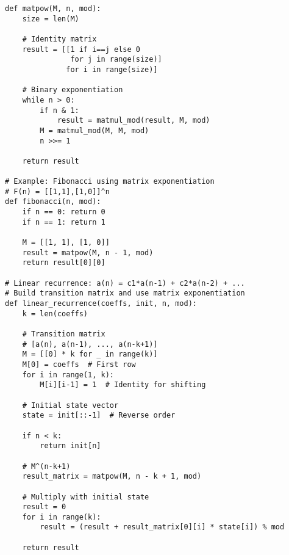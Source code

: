 \begin{lstlisting}
def matpow(M, n, mod):
    size = len(M)
    
    # Identity matrix
    result = [[1 if i==j else 0 
               for j in range(size)] 
              for i in range(size)]
    
    # Binary exponentiation
    while n > 0:
        if n & 1:
            result = matmul_mod(result, M, mod)
        M = matmul_mod(M, M, mod)
        n >>= 1
    
    return result

# Example: Fibonacci using matrix exponentiation
# F(n) = [[1,1],[1,0]]^n
def fibonacci(n, mod):
    if n == 0: return 0
    if n == 1: return 1
    
    M = [[1, 1], [1, 0]]
    result = matpow(M, n - 1, mod)
    return result[0][0]

# Linear recurrence: a(n) = c1*a(n-1) + c2*a(n-2) + ...
# Build transition matrix and use matrix exponentiation
def linear_recurrence(coeffs, init, n, mod):
    k = len(coeffs)
    
    # Transition matrix
    # [a(n), a(n-1), ..., a(n-k+1)]
    M = [[0] * k for _ in range(k)]
    M[0] = coeffs  # First row
    for i in range(1, k):
        M[i][i-1] = 1  # Identity for shifting
    
    # Initial state vector
    state = init[::-1]  # Reverse order
    
    if n < k:
        return init[n]
    
    # M^(n-k+1)
    result_matrix = matpow(M, n - k + 1, mod)
    
    # Multiply with initial state
    result = 0
    for i in range(k):
        result = (result + result_matrix[0][i] * state[i]) % mod
    
    return result
\end{lstlisting}
